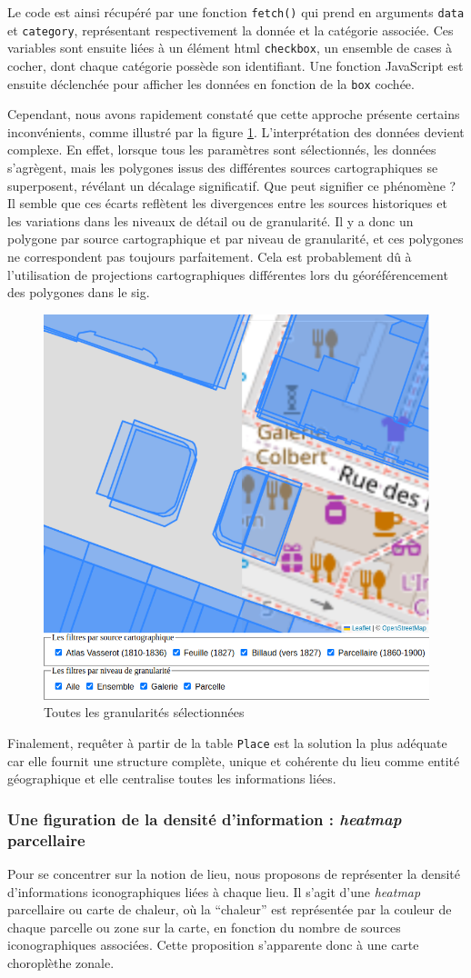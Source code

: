 Le code est ainsi récupéré par une fonction \texttt{fetch()} qui prend en arguments \texttt{data} et \texttt{category}, représentant respectivement la donnée et la catégorie associée. Ces variables sont ensuite liées à un élément \acrshort{html} \texttt{checkbox}, un ensemble de cases à cocher, dont chaque catégorie possède son identifiant. Une fonction JavaScript est ensuite déclenchée pour afficher les données en fonction de la \texttt{box} cochée.

Cependant, nous avons rapidement constaté que cette approche présente certains inconvénients, comme illustré par la figure \ref{fig:gran-tout}. L'interprétation des données devient complexe. En effet, lorsque tous les paramètres sont sélectionnés, les données s'agrègent, mais les polygones issus des différentes sources cartographiques se superposent, révélant un décalage significatif. Que peut signifier ce phénomène ? Il semble que ces écarts reflètent les divergences entre les sources historiques et les variations dans les niveaux de détail ou de granularité. Il y a donc un polygone par source cartographique et par niveau de granularité, et ces polygones ne correspondent pas toujours parfaitement. Cela est probablement dû à l'utilisation de projections cartographiques différentes lors du géoréférencement des polygones dans le \acrshort{sig}.

\begin{figure}[h!]
    \centering
    \includegraphics[width=0.4\linewidth]{images/gran-tout.png}
    \caption{Toutes les granularités sélectionnées}
    \label{fig:gran-tout}
\end{figure}

Finalement, requêter à partir de la table \texttt{Place} est la solution la plus adéquate car elle fournit une structure complète, unique et cohérente du lieu comme entité géographique et elle centralise toutes les informations liées. 

\subsubsection{Une figuration de la densité d'information : \textit{heatmap} parcellaire}
Pour se concentrer sur la notion de lieu, nous proposons de représenter la densité d'informations iconographiques liées à chaque lieu. Il s'agit d'une \textit{heatmap} parcellaire ou carte de chaleur, où la \enquote{chaleur} est représentée par la couleur de chaque parcelle ou zone sur la carte, en fonction du nombre de sources iconographiques associées. Cette proposition s'apparente donc à une carte choroplèthe zonale.

